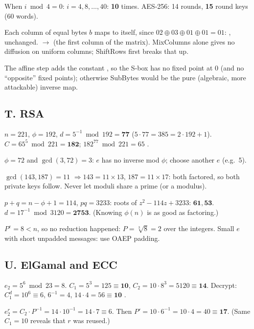 \ans When $i \bmod 4 = 0$: $i = 4, 8, \dots, 40$: \textbf{10} times. AES-256: 14 rounds, \textbf{15} round keys (60 words).

\ans Each column of equal bytes $b$ maps to itself, since $02 \oplus 03 \oplus 01 \oplus 01 = 01$: \ttx{[01 01 01 01]}, \ttx{[C6 C6 C6 C6]} unchanged. \ttx{[01 00 00 00]} $\to$ \ttx{[02 01 01 03]} (the first column of the matrix). MixColumns alone gives no diffusion on uniform columns; ShiftRows first breaks that up.

\ans The affine step adds the constant , so the S-box has no fixed point at 0 (and no ``opposite'' fixed points); otherwise SubBytes would be the pure (algebraic, more attackable) inverse map.

\subsection*{T. RSA}
\ans $n = 221$, $\phi = 192$, $d = 5^{-1} \bmod 192 = \mathbf{77}$ ($5 \cdot 77 = 385 = 2 \cdot 192 + 1$). $C = 65^5 \bmod 221 = \mathbf{182}$; $182^{77} \bmod 221 = 65$ \checkmark.

\ans $\phi = 72$ and $\gcd(3, 72) = 3$: $e$ has no inverse mod $\phi$; choose another $e$ (e.g.\ 5).

\ans $\gcd(143, 187) = 11$ $\Rightarrow 143 = 11 \times 13$, $187 = 11 \times 17$: both factored, so both private keys follow. Never let moduli share a prime (or a modulus).

\ans $p + q = n - \phi + 1 = 114$, $pq = 3233$: roots of $z^2 - 114z + 3233$: $\mathbf{61, 53}$. $d = 17^{-1} \bmod 3120 = \mathbf{2753}$. (Knowing $\phi(n)$ is as good as factoring.)

\ans $P^e = 8 < n$, so no reduction happened: $P = \sqrt[3]{8} = 2$ over the integers. Small $e$ with short unpadded messages: use OAEP padding.

\subsection*{U. ElGamal and ECC}
\ans $e_2 = 5^6 \bmod 23 = 8$. $C_1 = 5^3 = 125 \equiv \mathbf{10}$, $C_2 = 10 \cdot 8^3 = 5120 \equiv \mathbf{14}$. Decrypt: $C_1^d = 10^6 \equiv 6$, $6^{-1} = 4$, $14 \cdot 4 = 56 \equiv \mathbf{10}$ \checkmark.

\ans $e_2^r = C_2 \cdot P^{-1} = 14 \cdot 10^{-1} = 14 \cdot 7 \equiv 6$. Then $P' = 10 \cdot 6^{-1} = 10 \cdot 4 = 40 \equiv \mathbf{17}$. (Same $C_1 = 10$ reveals that $r$ was reused.)


